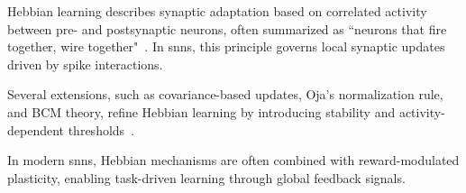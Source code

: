 Hebbian learning describes synaptic adaptation based on correlated activity between pre- and postsynaptic neurons, often summarized as ``neurons that fire together, wire together"~\cite{Ch_1_R16}. In \ac{snn}s, this principle governs local synaptic updates driven by spike interactions.

Several extensions, such as covariance-based updates, Oja's normalization rule, and BCM theory, refine Hebbian learning by introducing stability and activity-dependent thresholds~\cite{Ch_1_R32, Ch_1_R19, Ch_1_R31}.


In modern \ac{snn}s, Hebbian mechanisms are often combined with reward-modulated plasticity, enabling task-driven learning through global feedback signals.




